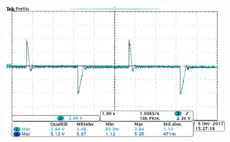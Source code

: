 \endminipage
%
\par
%
\minipage{\linewidth}
    \begin{center}
        \captionsetup{type=figure}
        \begin{adjustbox}{max width=\linewidth, keepaspectratio}
            \includegraphics[width=120mm]{jpg/Sinus-KP-50-Skt-Ist-Soll-Differenz}
        \end{adjustbox}
        \label{fig:Sinus-KP-50-Skt-Ist-Soll-Differenz}
    \end{center}
\endminipage
%
